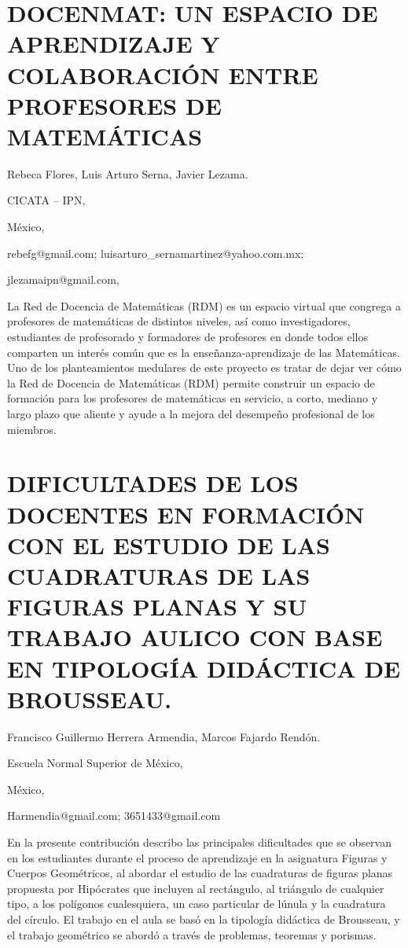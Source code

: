 \section{DOCENMAT: UN ESPACIO DE APRENDIZAJE Y COLABORACIÓN ENTRE PROFESORES
DE MATEMÁTICAS}

\begin{datos}

Rebeca Flores, Luis Arturo Serna, Javier Lezama.

CICATA – IPN,

México,

rebefg@gmail.com; luisarturo\_sernamartinez@yahoo.com.mx;

jlezamaipn@gmail.com,

\end{datos}

La Red de Docencia de Matemáticas (RDM) es un espacio virtual que
congrega a profesores de matemáticas de distintos niveles, así como
investigadores, estudiantes de profesorado y formadores de profesores
en donde todos ellos comparten un interés común que es la enseñanza-aprendizaje
de las Matemáticas. Uno de los planteamientos medulares de este proyecto
es tratar de dejar ver cómo la Red de Docencia de Matemáticas (RDM)
permite construir un espacio de formación para los profesores de matemáticas
en servicio, a corto, mediano y largo plazo que aliente y ayude a
la mejora del desempeño profesional de los miembros. 


\section{DIFICULTADES DE LOS DOCENTES EN FORMACIÓN CON EL ESTUDIO DE LAS CUADRATURAS
DE LAS FIGURAS PLANAS Y SU TRABAJO AULICO CON BASE EN TIPOLOGÍA DIDÁCTICA
DE BROUSSEAU. }

\begin{datos}

Francisco Guillermo Herrera Armendia, Marcos Fajardo Rendón.

Escuela Normal Superior de México,

México,

Harmendia@gmail.com; 3651433@gmail.com

\end{datos}

En la presente contribución describo las principales dificultades
que se observan en los estudiantes durante el proceso de aprendizaje
en la asignatura Figuras y Cuerpos Geométricos, al abordar el estudio
de las cuadraturas de figuras planas propuesta por Hipócrates que
incluyen al rectángulo, al triángulo de cualquier tipo, a los polígonos
cualesquiera, un caso particular de lúnula y la cuadratura del círculo.
El trabajo en el aula se basó en la tipología didáctica de Brousseau,
y el trabajo geométrico se abordó a través de problemas, teoremas
y porismas.



